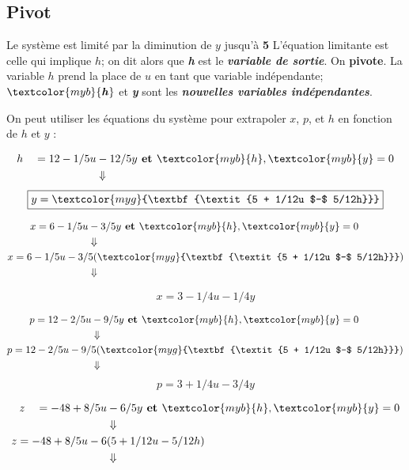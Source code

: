 \documentclass{report}
\begin{document}
\begin{multicols*}{3}
\section{Pivot}
Le système est limité par la diminution de $y$ jusqu'à \textcolor{myr}{\textbf{5}} 
L'équation limitante est celle qui implique $h$; on dit alors que 
\textcolor{myr}{\textbf{\textit{h}}} est le 
\textcolor{myr}{\textbf{\textit{variable de sortie}}}. On 
\textbf{pivote}. La variable $h$ prend la place de $u$ en tant que
variable indépendante;
$\textcolor{myb}{\textbf{\textit{h}}}$ et  
\textcolor{myb}{\textbf{\textit{y}}} sont les 
\textcolor{myb}{\textbf{\textit{nouvelles variables indépendantes}}}.   

On peut utiliser les équations du système pour extrapoler 
$x$, $p$, et $h$ en fonction de $h$ et $y$ :


\begin{align*}
    h \quad = 12 - 1/5u &-12/5y
    \textbf{ et } \textcolor{myb}{h}, \textcolor{myb}{y} = 0 
    \\
                 &\Downarrow
\end{align*}
      \[%
    \boxed{y = \textcolor{myg}{\textbf{\textit{5 + 1/12u $-$ 5/12h}}} }
      \]%


\begin{align*}
    x = 6 - 1/5u &-3/5y 
    \textbf{ et } \textcolor{myb}{h}, \textcolor{myb}{y} = 0 
    \\
      &\Downarrow
    \\ 
    x = 6 - 1/5u -3/&5(\textcolor{myg}{\textbf{\textit{5 + 1/12u $-$ 5/12h}}}) 
    \\
                    &\Downarrow
\end{align*}

\vspace{-1em}
      \[%
          \boxed{x = 3 -1/4u -1/4y}
      \]%

\begin{align*}
    p = 12 - 2/5u &-9/5y 
    \textbf{ et } \textcolor{myb}{h}, \textcolor{myb}{y} = 0 
    \\
      &\Downarrow
    \\ 
    p = 12 - 2/5u -9/&5(\textcolor{myg}{\textbf{\textit{5 + 1/12u $-$ 5/12h}}}) 
    \\
                    &\Downarrow
\end{align*}
\vspace{-1em}
      \[%
          \boxed{p = 3 + 1/4u -3/4y}
      \]%


\begin{align*}
    z \quad = -48 +8/5u &- 6/5y
    \textbf{ et } \textcolor{myb}{h}, \textcolor{myb}{y} = 0 
    \\
                      &\Downarrow \\
    z = -48 +8/5u -6&(5 +1/12u -5/12h)
    \\
                    &\Downarrow
\end{align*}


\end{multicols*}
\end{document}
